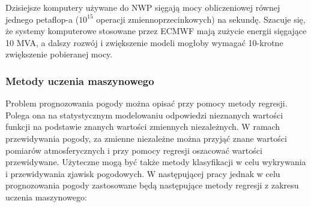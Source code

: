 Dzisiejsze komputery używane do NWP sięgają mocy obliczeniowej równej jednego petaflop-a ($10^{15}$ operacji
zmiennoprzecinkowych) na sekundę. Szacuje się, że systemy komputerowe stosowane przez ECMWF mają zużycie energii
sięgające 10 MVA, a dalszy rozwój i zwiększenie modeli mogłoby wymagać 10-krotne zwiększenie pobieranej mocy.

\subsubsection*{Metody uczenia maszynowego}

Problem prognozowania pogody można opisać przy pomocy metody regresji. Polega ona
na statystycznym modelowaniu odpowiedzi nieznanych wartości funkcji na podstawie
znanych wartości zmiennych niezależnych. W ramach przewidywania pogody, za zmienne niezależne
można przyjąć znane wartości pomiarów atmosferycznych i przy pomocy regresji oszacować 
wartości przewidywane. Użyteczne mogą być także metody klasyfikacji w celu wykrywania i 
przewidywania zjawisk pogodowych. W następującej pracy jednak w celu prognozowania pogody
zastosowane będą następujące metody regresji z zakresu uczenia maszynowego:


